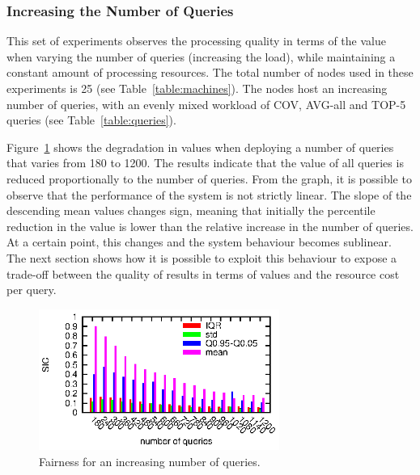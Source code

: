 \subsubsection*{Increasing the Number of Queries}

This set of experiments observes the processing quality in terms of the \sic value when varying the
number of queries (\ie increasing the load), while maintaining a constant amount of processing resources. 
The total number of nodes used in these experiments is 25 (see Table~\ref{table:machines}).
The nodes host an increasing number of queries, with an evenly mixed workload of
COV, AVG-all and TOP-5 queries (see Table~\ref{table:queries}).

Figure~\ref{fig:scalability:queries} shows the degradation in \sic values when deploying a
number of queries that varies from 180 to 1200. The results indicate that the value of all queries is
reduced proportionally to the number of queries. From the graph, it is possible to observe that the performance
of the system is not strictly linear. The slope of the descending mean \sic values changes sign, meaning
that initially the percentile reduction in the \sic value is lower than the relative increase in
the number of queries. At a certain point, this changes and the system behaviour becomes sublinear.
The next section shows how it is possible to exploit this behaviour to expose a trade-off between the
quality of results in terms of \sic values and the resource cost per query.
\begin{figure}[h!]
\centering
\includegraphics[width=0.7\textwidth]{img/tesi/queries_large}
\caption{Fairness for an increasing number of queries.}
\label{fig:scalability:queries}
\end{figure}
\clearpage



